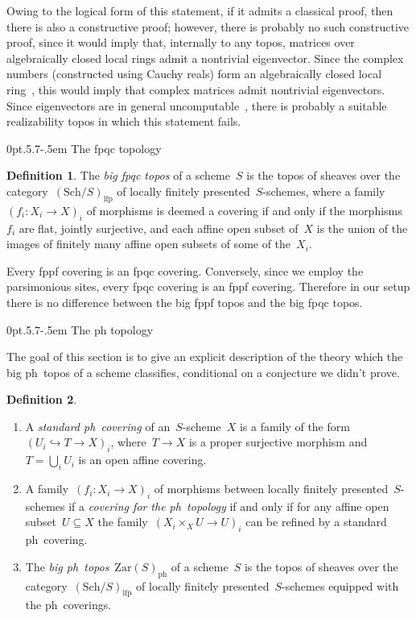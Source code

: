 \documentclass[10pt,reqno,a4paper]{amsbook}
\makeatletter
\theoremstyle{definition}
\newtheorem{defn}{Definition}[section]
\theoremstyle{plain}
\theoremstyle{remark}
\newcommand{\Zar}{\mathrm{Zar}}
\newcommand{\ph}{\mathrm{ph}}
\newcommand{\Sch}{\mathrm{Sch}}
\newcommand{\lfp}{\mathrm{lfp}}
\newcommand{\?}{\,{:}\,}
\renewcommand{\_}{\mathpunct{.}\,}
\def\subsection{\@startsection{subsection}{2}%
  {0pt}{.5\linespacing\@plus.7\linespacing}{-.5em}%
  {\normalfont\bfseries}}
\makeatother
\begin{document}
\begin{itemize}
Owing to the logical form of this statement, if it admits a classical proof, then there is also a
constructive proof; however, there is probably no such constructive proof,
since it would imply that, internally to any topos, matrices over
algebraically closed local rings admit a
nontrivial eigenvector. Since the complex numbers (constructed using Cauchy
reals) form an algebraically closed local
ring~\cite[Theorem~3.13]{ruitenburg:roots}, this would imply that complex
matrices admit nontrivial eigenvectors. Since eigenvectors are in general
uncomputable~\cite[Proposition~12]{ziegler:brattka:spectrum}, there is probably
a suitable realizability topos in which this statement fails.
\end{itemize}


\subsection{The fpqc topology}

\begin{defn}The \emph{big fpqc topos} of a scheme~$S$ is the topos of sheaves
over the category~$(\Sch/S)_\lfp$ of locally finitely presented~$S$-schemes, where a
family~$(f_i : X_i \to X)_i$ of morphisms is deemed a covering if and only if
the morphisms~$f_i$ are flat, jointly surjective, and each affine open subset
of~$X$ is the union of the images of finitely many affine open subsets of some of
the~$X_i$.
\end{defn}

Every fppf covering is an fpqc covering. Conversely, since we employ the
parsimonious sites, every fpqc covering is an fppf covering. Therefore in our
setup there is no difference between the big fppf topos and the big fpqc topos.


\subsection{The ph topology}

The goal of this section is to give an explicit description of the theory which
the big ph~topos of a scheme classifies, conditional on a conjecture we
didn't prove.

\begin{defn}\begin{enumerate}
\item A \emph{standard ph~covering} of an~$S$-scheme~$X$ is a family of
the form~$(U_i \hookrightarrow T \to X)_i$, where~$T \to X$ is a proper
surjective morphism and~$T = \bigcup_i U_i$ is an open affine covering.
\item A family~$(f_i : X_i \to X)_i$ of morphisms between locally finitely
presented~$S$-schemes if a \emph{covering for the ph~topology} if and
only if for any affine open subset~$U \subseteq X$ the family~$(X_i \times_X U
\to U)_i$ can be refined by a standard ph~covering.
\item The \emph{big ph~topos}~$\Zar(S)_\ph$ of a scheme~$S$ is the topos of
sheaves over the category~$(\Sch/S)_\lfp$ of locally finitely
presented~$S$-schemes equipped with the ph~coverings.
\end{enumerate}
\end{defn}
\end{document}
